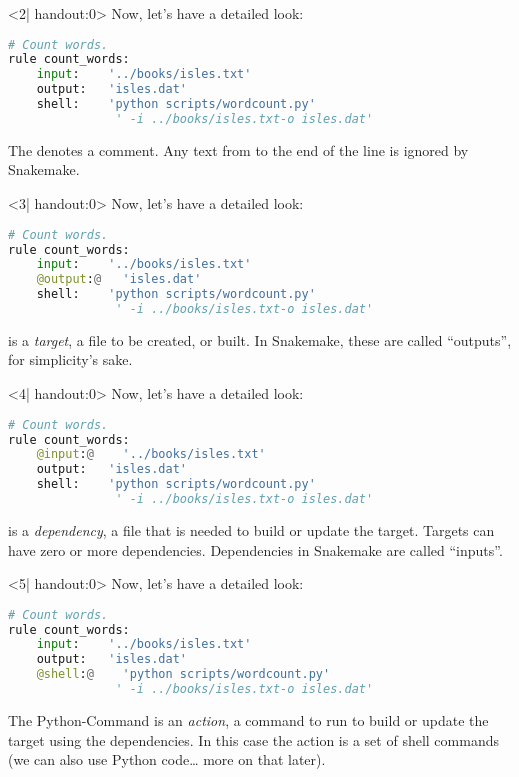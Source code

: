 \begin{frame}[fragile]
\begin{onlyenv}
    \end{onlyenv}
  \begin{onlyenv}<2| handout:0>
   Now, let's have a detailed look:
   \begin{lstlisting}[language=Python,style=Python]
# Count words.
rule count_words:
    input:    '../books/isles.txt'
    output:   'isles.dat'
    shell:    'python scripts/wordcount.py' 
               ' -i ../books/isles.txt-o isles.dat'
    \end{lstlisting}
    The \altverb[Python]{#} denotes a comment. Any text from \altverb[Python]{#} to the end of the line is ignored by Snakemake.
  \end{onlyenv}
  \begin{onlyenv}<3| handout:0>
   Now, let's have a detailed look:
   \begin{lstlisting}[language=Python,style=Python]
# Count words.
rule count_words:
    input:    '../books/isles.txt'
    @output:@   'isles.dat'
    shell:    'python scripts/wordcount.py' 
               ' -i ../books/isles.txt-o isles.dat'
    \end{lstlisting}
     is a \emph{target}, a file to be created, or built. In Snakemake, these are called “outputs”, for simplicity’s sake.
  \end{onlyenv}
  \begin{onlyenv}<4| handout:0>
   Now, let's have a detailed look:
   \begin{lstlisting}[language=Python,style=Python]
# Count words.
rule count_words:
    @input:@    '../books/isles.txt'
    output:   'isles.dat'
    shell:    'python scripts/wordcount.py' 
               ' -i ../books/isles.txt-o isles.dat'
    \end{lstlisting}
     is a \emph{dependency}, a file that is needed to build or update the target. Targets can have zero or more dependencies. Dependencies in Snakemake are called “inputs”.
  \end{onlyenv}
  \begin{onlyenv}<5| handout:0>
   Now, let's have a detailed look:
   \begin{lstlisting}[language=Python,style=Python]
# Count words.
rule count_words:
    input:    '../books/isles.txt'
    output:   'isles.dat'
    @shell:@    'python scripts/wordcount.py' 
               ' -i ../books/isles.txt-o isles.dat'
    \end{lstlisting}
    The Python-Command is an \emph{action}, a command to run to build or update the target using the dependencies. In this case the action is a set of shell commands (we can also use Python code… more on that later).

\end{onlyenv}
\end{frame}
